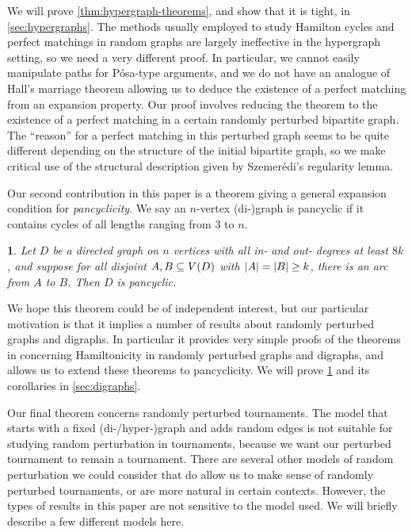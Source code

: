 \documentclass[11pt,english]{article}
\theoremstyle{plain}
\newtheorem{thm}{\protect\theoremname}
\theoremstyle{definition}
\theoremstyle{definition}
\theoremstyle{plain}
\theoremstyle{plain}
\theoremstyle{plain}
\theoremstyle{plain}
\theoremstyle{remark}
\theoremstyle{remark}
\let\originalleft\left
\let\originalright\right
\renewcommand{\left}{\mathopen{}\mathclose\bgroup\originalleft}
\renewcommand{\right}{\aftergroup\egroup\originalright}
\providecommand{\theoremname}{Theorem}
\begin{document}
We will prove \ref{thm:hypergraph-theorems}, and show that it is
tight, in \ref{sec:hypergraphs}. The methods usually employed to
study Hamilton cycles and perfect matchings in random graphs are largely
ineffective in the hypergraph setting, so we need a very different
proof. In particular, we cannot easily manipulate paths for P\'osa-type
arguments, and we do not have an analogue of Hall's marriage theorem
allowing us to deduce the existence of a perfect matching from an
expansion property. Our proof involves reducing the theorem to the
existence of a perfect matching in a certain randomly perturbed bipartite
graph. The ``reason'' for a perfect matching in this perturbed graph
seems to be quite different depending on the structure of the initial
bipartite graph, so we make critical use of the structural description
given by Szemer\'edi's regularity lemma.

Our second contribution in this paper is a theorem giving a general
expansion condition for\emph{ pancyclicity}. We say an $n$-vertex
\mbox{(di-)}graph is pancyclic if it contains cycles of all lengths
ranging from 3 to $n$.
\begin{thm}
\label{lem:pseudorandom-pancyclic}Let $D$ be a directed graph on
$n$ vertices with all in- and out- degrees at least $8k$, and suppose
for all disjoint $A,B\subseteq V\left(D\right)$ with $\left|A\right|=\left|B\right|\ge k$,
there is an arc from $A$ to $B$. Then $D$ is pancyclic.
\end{thm}
We hope this theorem could be of independent interest, but our particular
motivation is that it implies a number of results about randomly perturbed
graphs and digraphs. In particular it provides very simple proofs
of the theorems in \cite{BFM03} concerning Hamiltonicity in randomly
perturbed graphs and digraphs, and allows us to extend these theorems
to pancyclicity. We will prove \ref{lem:pseudorandom-pancyclic} and
its corollaries in \ref{sec:digraphs}.

Our final theorem concerns randomly perturbed tournaments. The model
that starts with a fixed \mbox{(di-/hyper-)}graph and adds random
edges is not suitable for studying random perturbation in tournaments,
because we want our perturbed tournament to remain a tournament. There
are several other models of random perturbation we could consider
that do allow us to make sense of randomly perturbed tournaments,
or are more natural in certain contexts. However, the types of results
in this paper are not sensitive to the model used. We will briefly
describe a few different models here.
\end{document}

